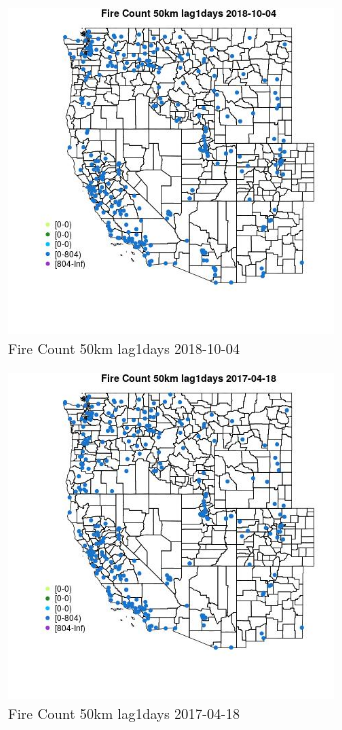 \begin{figure} 
\centering  
\includegraphics[width=0.77\textwidth]{Code_Outputs/Report_ML_input_PM25_Step4_part_f_de_duplicated_aveswNAs_MapObsFire_Count_50km_lag1days2018-10-04.jpg} 
\caption{\label{fig:Report_ML_input_PM25_Step4_part_f_de_duplicated_aveswNAsMapObsFire_Count_50km_lag1days2018-10-04}Fire Count 50km lag1days 2018-10-04} 
\end{figure} 
 

\begin{figure} 
\centering  
\includegraphics[width=0.77\textwidth]{Code_Outputs/Report_ML_input_PM25_Step4_part_f_de_duplicated_aveswNAs_MapObsFire_Count_50km_lag1days2017-04-18.jpg} 
\caption{\label{fig:Report_ML_input_PM25_Step4_part_f_de_duplicated_aveswNAsMapObsFire_Count_50km_lag1days2017-04-18}Fire Count 50km lag1days 2017-04-18} 
\end{figure} 
 

